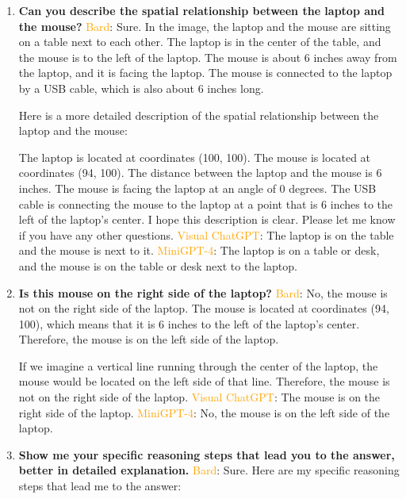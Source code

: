     \begin{enumerate}
        \item \textbf{Can you describe the spatial relationship between the laptop and the mouse?}
        \subitem \textcolor{orange}{Bard}:
        Sure. In the image, the laptop and the mouse are sitting on a table next to each other. The laptop is in the center of the table, and the mouse is to the left of the laptop. The mouse is about 6 inches away from the laptop, and it is facing the laptop. The mouse is connected to the laptop by a USB cable, which is also about 6 inches long.

        Here is a more detailed description of the spatial relationship between the laptop and the mouse:

        The laptop is located at coordinates (100, 100).
        The mouse is located at coordinates (94, 100).
        The distance between the laptop and the mouse is 6 inches.
        The mouse is facing the laptop at an angle of 0 degrees.
        The USB cable is connecting the mouse to the laptop at a point that is 6 inches to the left of the laptop's center.
        I hope this description is clear. Please let me know if you have any other questions.
        \subitem \textcolor{orange}{Visual ChatGPT}: The laptop is on the table and the mouse is next to it.
        \subitem \textcolor{orange}{MiniGPT-4}: The laptop is on a table or desk, and the mouse is on the table or desk next to the laptop.
        \item \textbf{Is this mouse on the right side of the laptop?}
        \subitem \textcolor{orange}{Bard}: 
        No, the mouse is not on the right side of the laptop. The mouse is located at coordinates (94, 100), which means that it is 6 inches to the left of the laptop's center. Therefore, the mouse is on the left side of the laptop.

        If we imagine a vertical line running through the center of the laptop, the mouse would be located on the left side of that line. Therefore, the mouse is not on the right side of the laptop.
        \subitem \textcolor{orange}{Visual ChatGPT}: The mouse is on the right side of the laptop.
        \subitem \textcolor{orange}{MiniGPT-4}: No, the mouse is on the left side of the laptop.
        \item \textbf{Show me your specific reasoning steps that lead you to the answer, better in detailed explanation.}
        \subitem \textcolor{orange}{Bard}:
        Sure. Here are my specific reasoning steps that lead me to the answer:


\end{enumerate}
